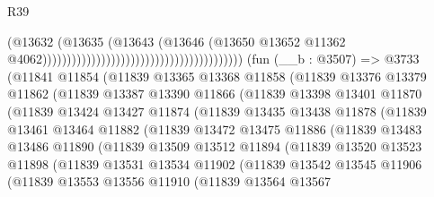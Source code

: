 \begin{lexlean}{R39}
\begin{coremodule}
                                                                            (@13632
                                                                              (@13635
                                                                                (@13643
                                                                                  (@13646
                                                                                    (@13650
                                                                                      @13652
                                                                                      @11362
                                                                                      @4062)))))))))))))))))))))))))))))))))))))))))
    (fun (__b : @3507) =>
    @3733
      (@11841
        @11854
        (@11839
          @13365
          @13368
          @11858
          (@11839
            @13376
            @13379
            @11862
            (@11839
              @13387
              @13390
              @11866
              (@11839
                @13398
                @13401
                @11870
                (@11839
                  @13424
                  @13427
                  @11874
                  (@11839
                    @13435
                    @13438
                    @11878
                    (@11839
                      @13461
                      @13464
                      @11882
                      (@11839
                        @13472
                        @13475
                        @11886
                        (@11839
                          @13483
                          @13486
                          @11890
                          (@11839
                            @13509
                            @13512
                            @11894
                            (@11839
                              @13520
                              @13523
                              @11898
                              (@11839
                                @13531
                                @13534
                                @11902
                                (@11839
                                  @13542
                                  @13545
                                  @11906
                                  (@11839
                                    @13553
                                    @13556
                                    @11910
                                    (@11839
                                      @13564
                                      @13567

\end{coremodule}
\end{lexlean}
